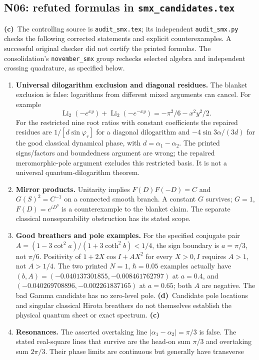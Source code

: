 \documentclass[11pt,a4paper]{article}
\newcommand{\C}{\textbf{(c)}\ }
\newcommand{\D}{\textbf{(d)}\ }
\newcommand{\file}[1]{\nolinkurl{#1}}
\begin{document}
\subsection{N06: refuted formulas in \file{smx_candidates.tex}}
\C The controlling source is \file{audit_smx.tex}; its independent
\file{audit_smx.py} checks the following corrected statements and explicit
counterexamples. A successful original checker did not certify the printed
formulas. The consolidation's \file{november_smx} group rechecks selected
algebra and independent crossing quadrature, as specified below.
\begin{enumerate}[leftmargin=*]
\item \textbf{Universal dilogarithm exclusion and diagonal residues.}
The blanket exclusion is false: logarithms from different mixed arguments
can cancel. For example
\[
 \operatorname{Li}_2(-e^{xy})+\operatorname{Li}_2(-e^{-xy})
 =-\pi^2/6-x^2y^2/2.
\]
For the restricted nine root ratios with constant coefficients the repaired
residues are $1/[d\sin\varphi_r]$ for a diagonal dilogarithm and
$-4\sin3\alpha/(3d)$ for the good classical dynamical phase, with
$d=\alpha_1-\alpha_2$. The printed signs/factors and boundedness argument
are wrong; the repaired meromorphic-pole argument excludes this restricted
basis. It is not a universal quantum-dilogarithm theorem.
\item \textbf{Mirror products.} Unitarity implies
$F(D)F(-D)=C$ and $G(S)^2=C^{-1}$ on a connected smooth branch. A constant
$G$ survives; $G=1$, $F(D)=e^{iD^3}$ is a counterexample to the blanket claim.
The separate classical nonseparability obstruction has its stated scope.
\item \textbf{Good breathers and pole examples.} For the specified conjugate
pair $A=(1-3\cot^2a)/(1+3\coth^2b)<1/4$, the sign boundary is $a=\pi/3$,
not $\pi/6$. Positivity of $1+2X\cos I+AX^2$ for every $X>0,I$ requires
$A>1$, not $A>1/4$. The two printed $N=1$, $\hbar=0.05$ examples actually
have $(b,A)=(-0.040137301855,-0.008461762797)$ at $a=0.4$, and
$(-0.040269708896,-0.002261837165)$ at $a=0.65$; both $A$ are negative.
The bad Gamma candidate has no zero-level pole. \D Candidate pole locations
and singular classical Hirota breathers do not themselves establish the
physical quantum sheet or exact spectrum. \C
\item \textbf{Resonances.} The asserted overtaking line
$|\alpha_1-\alpha_2|=\pi/3$ is false. The stated real-square lines that
survive are the head-on sum $\pi/3$ and overtaking sum $2\pi/3$.
Their phase limits are continuous but generally have transverse

\end{enumerate}
\end{document}
